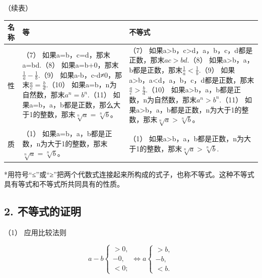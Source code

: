（续表）

{\def\LTcaptype{none} %
\begin{longtable}[]{@{}
  >{\raggedright\arraybackslash}p{}
  >{\raggedright\arraybackslash}p{}
  >{\raggedright\arraybackslash}p{}@{}}
\toprule\noalign{}
\begin{minipage}[b]{\linewidth}\raggedright
名称
\end{minipage} & \begin{minipage}[b]{\linewidth}\raggedright
等
\end{minipage} & \begin{minipage}[b]{\linewidth}\raggedright
不等式
\end{minipage} \\
\midrule\noalign{}
\endhead
\bottomrule\noalign{}
\endlastfoot
性 & （7） 如果a=b，c=d，那末a=bd.（8）
如果a=b+0，那末\(\frac{1}{a}-\frac{1}{b}\).（9）
如果a-b，c-d≠0，那末\(\frac{a}{c}=\frac{b}{d}\).（10）
如果a=b，n为自然数，那末\(a^n=b^n\).（11）
如果a=b，a，b都是正数，那么大于1的整数，那末\(\sqrt[n]{a}=\sqrt[n]{b}\)。
& （7）
如果a\textgreater b，c\textgreater d，a，b，c，d都是正数，那末\(ac>bd\).（8）
如果a\textgreater b，a，b都是正数，那末\(\frac{1}{a}<\frac{1}{b}\).（9）
如果a\textgreater b，a\textless d，a，b，c，d都是正数，那末\(\frac{a}{c}>\frac{b}{d}\).（10）
如果a\textgreater b，a，b都是正数，n为自然数，那末\(a^n>b^n\).（11）
如果a\textgreater b，a，b都是正数，n为大于1的整数，那末\(\sqrt[n]{a}>\sqrt[n]{b}\)。 \\
质 & （1）
如果a=b，a，b都是正数，n为大于1的整数，那末\(\sqrt[n]{a}=\sqrt[n]{b}\)。
& （1）
如果a\textgreater b，a，b都是正数，n为大于1的整数，那末\(\sqrt[n]{a}>\sqrt[n]{b}.\) \\
\end{longtable}
}

*用符号``≤''或``≥''把两个代数式连接起来所构成的式子，也称不等式。这种不等式具有等式和不等式所共同具有的性质。

\subsection{2. 不等式的证明}

（1） 应用比较法则

\[
a - b \left\{ \begin{array}{ll} > 0, \\ - 0, \\ < 0; \end{array} \right. \Leftrightarrow a \left\{ \begin{array}{ll} > b, \\ - b, \\ < b. \end{array} \right.
\]

